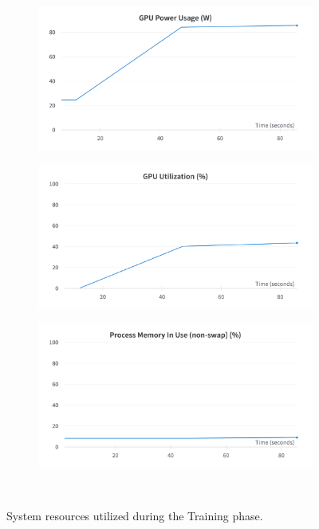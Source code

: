 \begin{figure}[H]
\begin{subfigure}{0.32\textwidth}
	\end{subfigure}\\
	\begin{subfigure}{0.32\textwidth}
		\centering
		\includegraphics[width=\textwidth]{chapters/3_models/imgs/grrun/grrungpupowerw.png}
	\end{subfigure}
	\begin{subfigure}{0.32\textwidth}
		\centering
		\includegraphics[width=\textwidth]{chapters/3_models/imgs/grrun/grrungputuilizationperc.png}
	\end{subfigure}
	\begin{subfigure}{0.32\textwidth}
		\centering
		\includegraphics[width=\textwidth]{chapters/3_models/imgs/grrun/grrunmemusage.png}
	\end{subfigure}\\
	\caption{System resources utilized during the Training phase.}
	\label{fig:grrunsysusage}
\end{figure}


